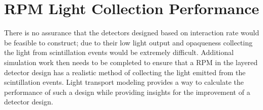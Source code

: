 
\section{RPM Light Collection Performance}
\label{sec:RPMLCP}

There is no assurance that the detectors designed based on interaction rate would be feasible to construct; due to their low light output and opaqueness collecting the light from scintillation events would be extremely difficult.  
Additional simulation work then needs to be completed to ensure that a RPM in the layered detector design has a realistic method of collecting the light emitted from the scintillation events.
Light transport modeling provides a way to calculate the performance of such a design while providing insights for the improvement of a detector design.

